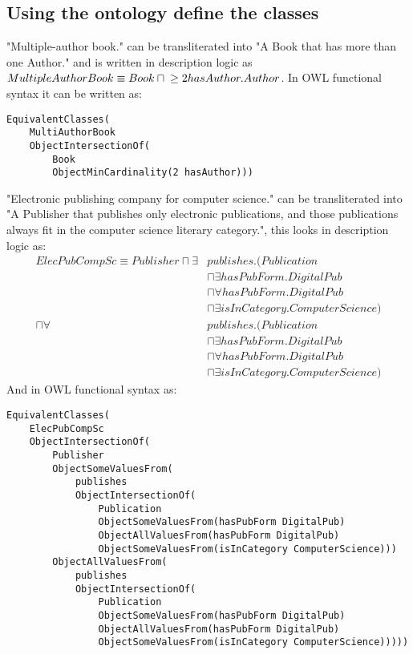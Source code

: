 \documentclass[a4paper,12pt]{article}
\begin{document}
\subsection[Define classes]{Using the ontology define the classes}
"Multiple-author book." can be transliterated into "A Book that has more than
one Author." and is written in description logic as $ MultipleAuthorBook\\
\equiv Book \sqcap {} \geq 2hasAuthor.Author $.  In OWL functional syntax it
can be written as:
\begin{Verbatim}[samepage=true]
EquivalentClasses(
    MultiAuthorBook
    ObjectIntersectionOf(
        Book
        ObjectMinCardinality(2 hasAuthor)))
\end{Verbatim}

"Electronic publishing company for computer science." can be transliterated
into "A Publisher that publishes only electronic publications, and those
publications always fit in the computer science literary category.", this looks
in description logic as:
\begin{align*}
ElecPubCompSc \equiv Publisher \sqcap \exists &publishes.(Publication\\
                             &\sqcap \exists hasPubForm.DigitalPub\\
                             &\sqcap \forall hasPubForm.DigitalPub\\
                             &\sqcap \exists isInCategory.ComputerScience)\\
                               \sqcap \forall &publishes.(Publication\\
                             &\sqcap \exists hasPubForm.DigitalPub\\
                             &\sqcap \forall hasPubForm.DigitalPub\\
                             &\sqcap \exists isInCategory.ComputerScience)
\end{align*}
And in OWL functional syntax as:
\begin{Verbatim}[samepage=true]
EquivalentClasses(
    ElecPubCompSc
    ObjectIntersectionOf(
        Publisher
        ObjectSomeValuesFrom(
            publishes
            ObjectIntersectionOf(
                Publication
                ObjectSomeValuesFrom(hasPubForm DigitalPub)
                ObjectAllValuesFrom(hasPubForm DigitalPub)
                ObjectSomeValuesFrom(isInCategory ComputerScience)))
        ObjectAllValuesFrom(
            publishes
            ObjectIntersectionOf(
                Publication
                ObjectSomeValuesFrom(hasPubForm DigitalPub)
                ObjectAllValuesFrom(hasPubForm DigitalPub)
                ObjectSomeValuesFrom(isInCategory ComputerScience)))))
\end{Verbatim}
\end{document}
